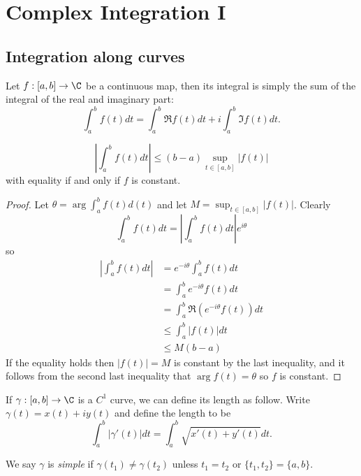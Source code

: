 \documentclass[a4paper]{article}
\begin{document}
\section{Complex Integration I}

\subsection{Integration along curves}

Let \(f: [a, b] \to \C\) be a continuous map, then its integral is simply the sum of the integral of the real and imaginary part:
\[
  \int_a^b f(t) dt = \int_a^b \Re f(t) dt + i \int_a^b \Im f(t) dt.
\]

\begin{proposition}
  \label{prop:absolute value integral inequality}
  \[
    \left| \int_a^b f(t) dt \right| \leq (b - a) \sup_{t \in [a, b]} |f(t)|
  \]
  with equality if and only if \(f\) is constant.
\end{proposition}

\begin{proof}
  Let \(\theta = \arg \int_a^b f(t)d(t)\) and let \(M = \sup_{t \in [a, b]} |f(t)|\). Clearly
  \[
    \int_a^b f(t) dt = \left| \int_a^b f(t) dt\right| e^{i\theta}
  \]
  so
  \begin{align*}
    \left|\int_a^b f(t)dt\right| &= e^{-i\theta} \int_a^b f(t) dt \\
                                 &= \int_a^b e^{-i\theta}f(t)dt \\
                                 &= \int_a^b \Re(e^{-i\theta}f(t)) dt \\
                                 &\leq \int_a^b|f(t)|dt \\
                                 &\leq M(b - a)
  \end{align*}
  If the equality holds then \(|f(t)| = M\) is constant by the last inequality, and it follows from the second last inequality that \(\arg f(t) = \theta\) so \(f\) is constant.
\end{proof}

If \(\gamma: [a, b] \to \C\) is a \(C^1\) curve, we can define its length as follow. Write \(\gamma(t) = x(t) + iy(t)\) and define the length to be
\[
  \int_a^b |\gamma'(t)|dt = \int_a^b \sqrt{x'(t) + y'(t)} dt.
\]

\begin{definition}
  We say \(\gamma\) is \emph{simple} if \(\gamma(t_1) \neq \gamma(t_2)\) unless \(t_1 = t_2\) or \(\{t_1, t_2\} = \{a, b\}\).
\end{definition}
\end{document}
